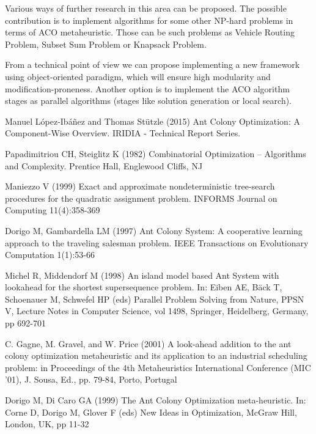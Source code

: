 \documentclass[12pt]{article}
\begin{document}
Various ways of further research in this area can be proposed. The possible contribution is to implement algorithms for some other NP-hard problems in terms of ACO metaheuristic. Those can be such problems as Vehicle Routing Problem, Subset Sum Problem or Knapsack Problem.

From a technical point of view we can propose implementing a new framework using object-oriented paradigm, which will ensure high modularity and modification-proneness. Another option is to implement the ACO algorithm stages as parallel algorithms (stages like solution generation or local search). 




\begin{thebibliography}{1}

 Manuel L{\'o}pez-Ib{\'a}{\~n}ez and Thomas St{\"u}tzle (2015) Ant Colony Optimization: A Component-Wise Overview.  IRIDIA - Technical Report Series.

 Papadimitriou CH, Steiglitz K (1982) Combinatorial Optimization – Algorithms and Complexity. Prentice Hall, Englewood Cliffs, NJ

 Maniezzo V (1999) Exact and approximate nondeterministic tree-search procedures for the quadratic assignment problem. INFORMS Journal on Computing 11(4):358-369

 Dorigo M, Gambardella LM (1997) Ant Colony System: A cooperative learning approach to the traveling salesman problem. IEEE Transactions on Evolutionary Computation 1(1):53-66

 Michel R, Middendorf M (1998) An island model based Ant System with lookahead for the shortest supersequence problem. In: Eiben AE, Bäck T, Schoenauer M, Schwefel HP (eds) Parallel Problem Solving from Nature, PPSN V, Lecture Notes in Computer Science, vol 1498, Springer, Heidelberg, Germany, pp 692-701

 C. Gagne, M. Gravel, and W. Price (2001) A look-ahead addition to the ant colony optimization metaheuristic and its application to an industrial scheduling problem: in Proceedings of the 4th Metaheuristics International Conference (MIC ’01), J. Sousa, Ed., pp. 79-84, Porto, Portugal

 Dorigo M, Di Caro GA (1999) The Ant Colony Optimization meta-heuristic. In: Corne D, Dorigo M, Glover F (eds) New Ideas in Optimization, McGraw Hill, London, UK, pp 11-32


\end{thebibliography}
\end{document}
